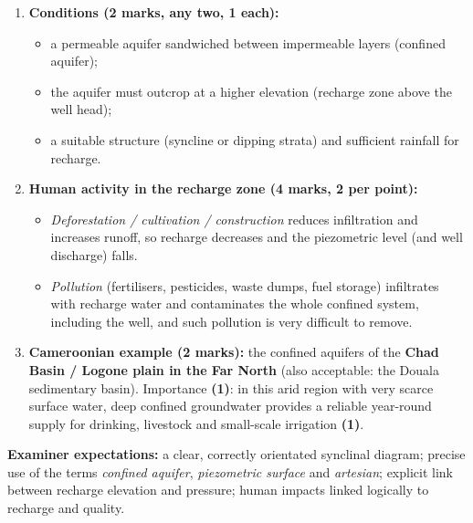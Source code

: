 \documentclass[11pt]{article}
\begin{document}
\begin{corrige}[Exercise 9]
\begin{enumerate}
\item \textbf{Conditions (2 marks, any two, 1 each):}
\begin{itemize}
\item a permeable aquifer sandwiched between impermeable layers (confined aquifer);
\item the aquifer must outcrop at a higher elevation (recharge zone above the well head);
\item a suitable structure (syncline or dipping strata) and sufficient rainfall for recharge.
\end{itemize}
\item \textbf{Human activity in the recharge zone (4 marks, 2 per point):}
\begin{itemize}
\item \emph{Deforestation / cultivation / construction} reduces infiltration and increases runoff, so recharge decreases and the piezometric level (and well discharge) falls.
\item \emph{Pollution} (fertilisers, pesticides, waste dumps, fuel storage) infiltrates with recharge water and contaminates the whole confined system, including the well, and such pollution is very difficult to remove.
\end{itemize}
\item \textbf{Cameroonian example (2 marks):} the confined aquifers of the \textbf{Chad Basin / Logone plain in the Far North} (also acceptable: the Douala sedimentary basin). Importance \textbf{(1)}: in this arid region with very scarce surface water, deep confined groundwater provides a reliable year-round supply for drinking, livestock and small-scale irrigation \textbf{(1)}.
\end{enumerate}

\textbf{Examiner expectations:} a clear, correctly orientated synclinal diagram; precise use of the terms \emph{confined aquifer}, \emph{piezometric surface} and \emph{artesian}; explicit link between recharge elevation and pressure; human impacts linked logically to recharge and quality.
\end{corrige}
\end{document}
